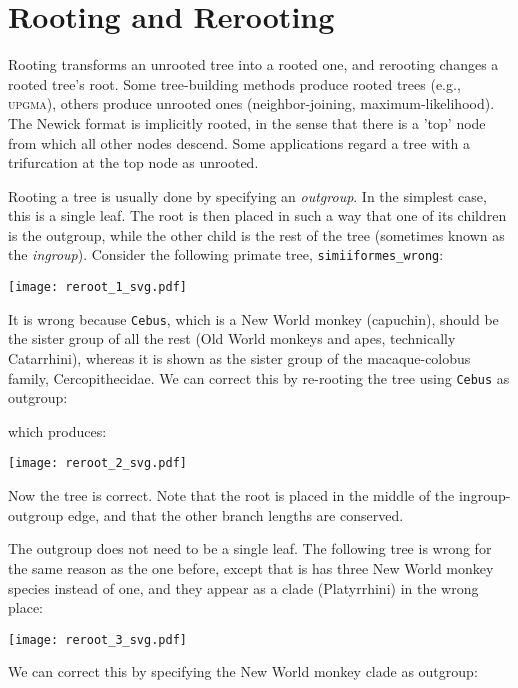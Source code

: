 
\section{Rooting and Rerooting}
\label{sct_reroot}

Rooting transforms an unrooted tree into a rooted one, and rerooting changes a
rooted tree's root. Some tree-building methods produce rooted trees (e.g.,
\textsc{upgma}), others produce unrooted ones (neighbor-joining,
maximum-likelihood).  The Newick format is implicitly rooted, in the sense that
there is a 'top' node from which all other nodes descend. Some applications
regard a tree with a trifurcation at the top node as unrooted. 

Rooting a tree is usually done by specifying an \textit{outgroup}. In the
simplest case, this is a single leaf. The root is then placed in such a way
that one of its children is the outgroup, while the other child is the rest of
the tree (sometimes known as the \textit{ingroup}). Consider the following
primate tree, \texttt{simiiformes\_wrong}:

\begin{center}
\texttt{[image: reroot\_1\_svg.pdf]}
\end{center}

\noindent{}It is wrong because \texttt{Cebus}, which is a New World monkey (capuchin), should be the sister group of all the rest (Old World monkeys and apes, technically Catarrhini), whereas it is shown as the sister group of the macaque-colobus family, Cercopithecidae. We can correct this by re-rooting the tree using \texttt{Cebus} as outgroup:

which produces:

\begin{center}
\texttt{[image: reroot\_2\_svg.pdf]}
\end{center}

\noindent{}Now the tree is correct. Note that the root is placed in the middle of the ingroup-outgroup edge, and that the other branch lengths are conserved.

The outgroup does not need to be a single leaf. The following tree is
wrong for the same reason as the one before, except that is has three New World
monkey species instead of one, and they appear as a clade (Platyrrhini) in the
wrong place:

\begin{center}
\texttt{[image: reroot\_3\_svg.pdf]}
\end{center}

\noindent{}We can correct this by specifying the New World monkey clade as outgroup:

